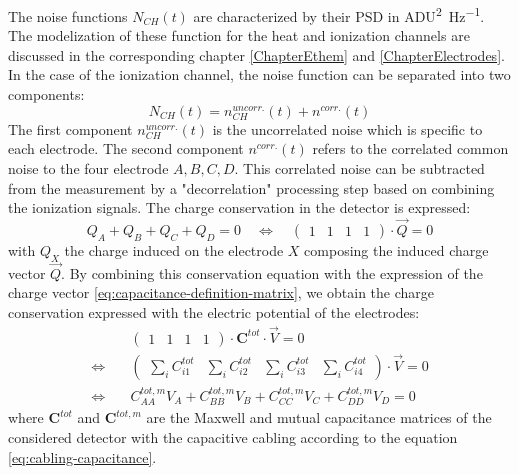 The noise functions $N_{CH}(t)$ are characterized by their PSD in \si{\textsf{ADU}^2\per\Hz}. The modelization of these function for the heat and ionization channels are discussed in the corresponding chapter \ref{ChapterEthem} and \ref{ChapterElectrodes}. In the case of the ionization channel, the noise function can be separated into two components:
\begin{equation}
\label{eq:noise-corr}
N_{CH}(t) = n_{CH}^{uncorr.}(t) + n^{corr.}(t)
\end{equation}
The first component $n_{CH}^{uncorr.}(t)$ is the uncorrelated noise which is specific to each electrode. The second component $n^{corr.}(t)$ refers to the correlated common noise to the four electrode $A,B,C,D$. This correlated noise can be subtracted from the measurement by a "decorrelation" processing step based on combining the ionization signals.
The charge conservation in the detector is expressed:
\begin{equation}
\label{eq:charge-conservation}
Q_A + Q_B + Q_C + Q_D = 0
\quad \Leftrightarrow \quad
\begin{pmatrix}
1 & 1 & 1 & 1
\end{pmatrix}
\cdot \vec{Q} = 0
\end{equation}
 with $Q_X$ the charge induced on the electrode $X$ composing the induced charge vector $\vec{Q}$. By combining this conservation equation with the expression of the charge vector \ref{eq:capacitance-definition-matrix}, we obtain the charge conservation expressed with the electric potential of the electrodes:
\begin{equation}
\begin{split}
& \begin{pmatrix}
1 & 1 & 1 & 1
\end{pmatrix} \cdot 
\bm{C}^{tot} \cdot \vec{V} = 0 \\
\Leftrightarrow \quad & 
\begin{pmatrix}
\sum_i C_{i1}^{tot} & \sum_i C_{i2}^{tot} & \sum_i C_{i3}^{tot} & \sum_i C_{i4}^{tot}
\end{pmatrix}
\cdot \vec{V} = 0 \\
\Leftrightarrow \quad &
C_{AA}^{tot, m} V_A + C_{BB}^{tot, m} V_B + C_{CC}^{tot, m} V_C + C_{DD}^{tot, m} V_D = 0
\end{split}
\end{equation}
where $\bm{C}^{tot}$ and $\bm{C}^{tot, m}$ are the Maxwell and mutual capacitance matrices of the considered detector with the capacitive cabling according to the equation \ref{eq:cabling-capacitance}.
